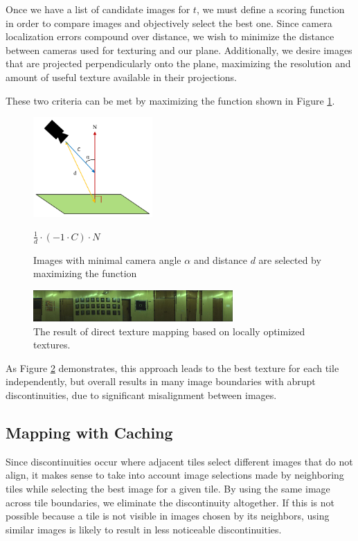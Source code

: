 \documentclass[10pt,twocolumn,letterpaper]{article}
\begin{document}
Once we have a list of candidate images for $t$, we must define a
scoring function in order to compare images and objectively select the
best one. Since camera localization errors compound over distance, we
wish to minimize the distance between cameras used for texturing and
our plane. Additionally, we desire images that are projected
perpendicularly onto the plane, maximizing the resolution and amount
of useful texture available in their projections.

These two criteria can be met by maximizing the function shown in
Figure \ref{fig:scoringFunction}.

\begin{figure}
  \centering
  \includegraphics[height=1.5in]{scoringFunction.pdf}
  \caption{Images with minimal camera angle $\alpha$ and distance $d$
    are selected by maximizing the function}
  \begin{center}$\frac{1}{d} \cdot (-1 \cdot C) \cdot N$ \end{center}
  \label{fig:scoringFunction}
\end{figure}



\begin{figure}
  \centering
  \includegraphics[width=3in]{wall1_naive.jpg}
  \caption{The result of direct texture mapping based on locally
    optimized textures.}
  \label{fig:directMapping}
\end{figure}


As Figure \ref{fig:directMapping} demonstrates, this approach leads to
the best texture for each tile independently, but overall results in
many image boundaries with abrupt discontinuities, due to significant
misalignment between images.

\subsection{Mapping with Caching}
\label{sec:mappingWithCaching}
Since discontinuities occur where adjacent tiles select different
images that do not align, it makes sense to take into account image
selections made by neighboring tiles while selecting the best image
for a given tile. By using the same image across tile boundaries, we
eliminate the discontinuity altogether. If this is not possible
because a tile is not visible in images chosen by its neighbors, using
similar images is likely to result in less noticeable discontinuities.
\end{document}
